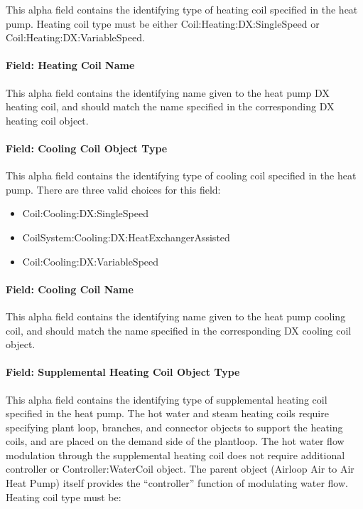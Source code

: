 This alpha field contains the identifying type of heating coil specified in the heat pump. Heating coil type must be either Coil:Heating:DX:SingleSpeed or Coil:Heating:DX:VariableSpeed.

\paragraph{Field: Heating Coil Name}\label{field-heating-coil-name-3}

This alpha field contains the identifying name given to the heat pump DX heating coil, and should match the name specified in the corresponding DX heating coil object.

\paragraph{Field: Cooling Coil Object Type}\label{field-cooling-coil-object-type-3}

This alpha field contains the identifying type of cooling coil specified in the heat pump. There are three valid choices for this field:

\begin{itemize}
\item
  Coil:Cooling:DX:SingleSpeed
\item
  CoilSystem:Cooling:DX:HeatExchangerAssisted
\item
  Coil:Cooling:DX:VariableSpeed
\end{itemize}

\paragraph{Field: Cooling Coil Name}\label{field-cooling-coil-name-3}

This alpha field contains the identifying name given to the heat pump cooling coil, and should match the name specified in the corresponding DX cooling coil object.

\paragraph{Field: Supplemental Heating Coil Object Type}\label{field-supplemental-heating-coil-object-type-1}

This alpha field contains the identifying type of supplemental heating coil specified in the heat pump. The hot water and steam heating coils require specifying plant loop, branches, and connector objects to support the heating coils, and are placed on the demand side of the plantloop. The hot water flow modulation through the supplemental heating coil does not require additional controller or Controller:WaterCoil object. The parent object (Airloop Air to Air Heat Pump) itself provides the ``controller'' function of modulating water flow. Heating coil type must be:

